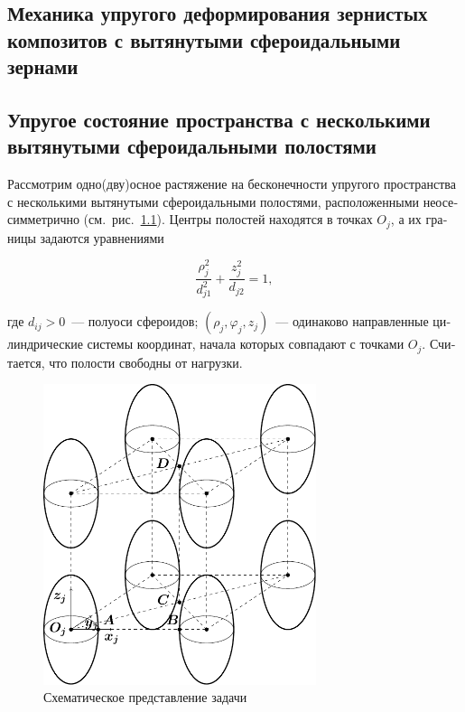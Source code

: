 
\begin{russian}
\chapter[Механика упругого деформирования зернистых композитов с вытянутыми сфероидальными зернами]{Механика упругого деформирования зернистых композитов с вытянутыми сфероидальными зернами}

\section[Упругое состояние пространства с несколькими вытянутыми сфероидальными полостями]{Упругое состояние пространства с несколькими вытянутыми сфероидальными полостями}


Рассмотрим одно(дву)осное растяжение на бесконечности упругого пространства с несколькими вытянутыми сфероидальными полостями, расположенными неосесимметрично (см.~рис.~\ref{f:9:1}). Центры полостей находятся в точках $O_j$, а их границы задаются уравнениями

\begin{equation}
\frac{{\rho _j^2}}{{d_{j1}^2}} + \frac{{z_j^2}}{{{d_{j2}}}} = 1,
\end{equation}

\noindent где $d_{ij}>0$~--- полуоси сфероидов; $(\rho_j,\varphi_j,z_j)$~--- одинаково направленные цилиндрические системы координат, начала которых совпадают с точками $O_j$. Считается, что полости свободны от нагрузки.

\begin{figure}[h!]
\centering
\includegraphics[width=8cm]{cartesian-spheroids.pdf}
\caption{Схематическое представление задачи}
\label{f:9:1}
\end{figure}


\end{russian}
